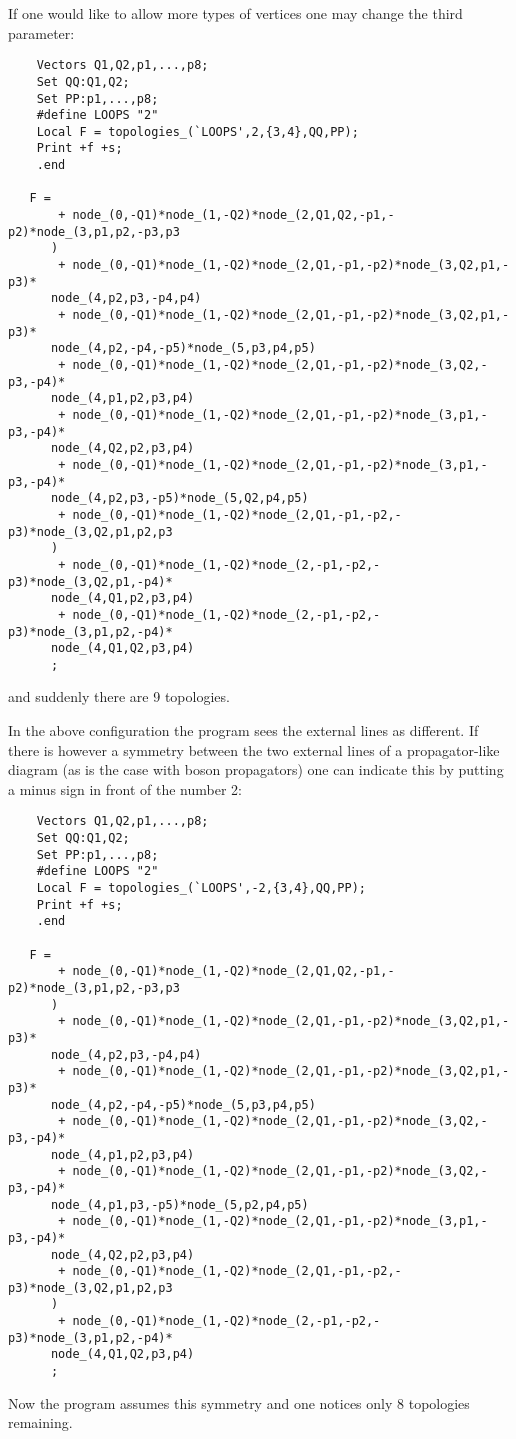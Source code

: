 If one would like to allow more types of vertices one may change 
the third parameter:
\begin{verbatim}
    Vectors Q1,Q2,p1,...,p8;
    Set QQ:Q1,Q2;
    Set PP:p1,...,p8;
    #define LOOPS "2"
    Local F = topologies_(`LOOPS',2,{3,4},QQ,PP);
    Print +f +s;
    .end

   F =
       + node_(0,-Q1)*node_(1,-Q2)*node_(2,Q1,Q2,-p1,-p2)*node_(3,p1,p2,-p3,p3
      )
       + node_(0,-Q1)*node_(1,-Q2)*node_(2,Q1,-p1,-p2)*node_(3,Q2,p1,-p3)*
      node_(4,p2,p3,-p4,p4)
       + node_(0,-Q1)*node_(1,-Q2)*node_(2,Q1,-p1,-p2)*node_(3,Q2,p1,-p3)*
      node_(4,p2,-p4,-p5)*node_(5,p3,p4,p5)
       + node_(0,-Q1)*node_(1,-Q2)*node_(2,Q1,-p1,-p2)*node_(3,Q2,-p3,-p4)*
      node_(4,p1,p2,p3,p4)
       + node_(0,-Q1)*node_(1,-Q2)*node_(2,Q1,-p1,-p2)*node_(3,p1,-p3,-p4)*
      node_(4,Q2,p2,p3,p4)
       + node_(0,-Q1)*node_(1,-Q2)*node_(2,Q1,-p1,-p2)*node_(3,p1,-p3,-p4)*
      node_(4,p2,p3,-p5)*node_(5,Q2,p4,p5)
       + node_(0,-Q1)*node_(1,-Q2)*node_(2,Q1,-p1,-p2,-p3)*node_(3,Q2,p1,p2,p3
      )
       + node_(0,-Q1)*node_(1,-Q2)*node_(2,-p1,-p2,-p3)*node_(3,Q2,p1,-p4)*
      node_(4,Q1,p2,p3,p4)
       + node_(0,-Q1)*node_(1,-Q2)*node_(2,-p1,-p2,-p3)*node_(3,p1,p2,-p4)*
      node_(4,Q1,Q2,p3,p4)
      ;
\end{verbatim}
and suddenly there are 9 topologies.

In the above configuration the program sees the external lines as 
different. If there is however a symmetry between the two external lines of 
a propagator-like diagram (as is the case with boson propagators) one can 
indicate this by putting a minus sign in front of the number 2:
\begin{verbatim}
    Vectors Q1,Q2,p1,...,p8;
    Set QQ:Q1,Q2;
    Set PP:p1,...,p8;
    #define LOOPS "2"
    Local F = topologies_(`LOOPS',-2,{3,4},QQ,PP);
    Print +f +s;
    .end

   F =
       + node_(0,-Q1)*node_(1,-Q2)*node_(2,Q1,Q2,-p1,-p2)*node_(3,p1,p2,-p3,p3
      )
       + node_(0,-Q1)*node_(1,-Q2)*node_(2,Q1,-p1,-p2)*node_(3,Q2,p1,-p3)*
      node_(4,p2,p3,-p4,p4)
       + node_(0,-Q1)*node_(1,-Q2)*node_(2,Q1,-p1,-p2)*node_(3,Q2,p1,-p3)*
      node_(4,p2,-p4,-p5)*node_(5,p3,p4,p5)
       + node_(0,-Q1)*node_(1,-Q2)*node_(2,Q1,-p1,-p2)*node_(3,Q2,-p3,-p4)*
      node_(4,p1,p2,p3,p4)
       + node_(0,-Q1)*node_(1,-Q2)*node_(2,Q1,-p1,-p2)*node_(3,Q2,-p3,-p4)*
      node_(4,p1,p3,-p5)*node_(5,p2,p4,p5)
       + node_(0,-Q1)*node_(1,-Q2)*node_(2,Q1,-p1,-p2)*node_(3,p1,-p3,-p4)*
      node_(4,Q2,p2,p3,p4)
       + node_(0,-Q1)*node_(1,-Q2)*node_(2,Q1,-p1,-p2,-p3)*node_(3,Q2,p1,p2,p3
      )
       + node_(0,-Q1)*node_(1,-Q2)*node_(2,-p1,-p2,-p3)*node_(3,p1,p2,-p4)*
      node_(4,Q1,Q2,p3,p4)
      ;
\end{verbatim}
Now the program assumes this symmetry and one notices only 8 topologies 
remaining.

